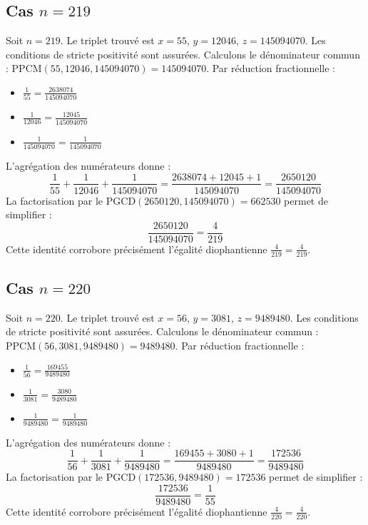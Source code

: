\documentclass[11pt,a4paper]{article}
\begin{document}
\subsection{Cas $n = 219$}
Soit $n = 219$. Le triplet trouvé est $x = 55$, $y = 12046$, $z = 145094070$.
Les conditions de stricte positivité sont assurées.
Calculons le dénominateur commun : $\text{PPCM}(55, 12046, 145094070) = 145094070$.
Par réduction fractionnelle :
\begin{itemize}
    \item $\frac{1}{55} = \frac{2638074}{145094070}$
    \item $\frac{1}{12046} = \frac{12045}{145094070}$
    \item $\frac{1}{145094070} = \frac{1}{145094070}$
\end{itemize}
L'agrégation des numérateurs donne :
$$ \frac{1}{55} + \frac{1}{12046} + \frac{1}{145094070} = \frac{2638074 + 12045 + 1}{145094070} = \frac{2650120}{145094070} $$
La factorisation par le $\text{PGCD}(2650120, 145094070) = 662530$ permet de simplifier :
$$ \frac{2650120}{145094070} = \frac{4}{219} $$
Cette identité corrobore précisément l'égalité diophantienne $\frac{4}{219} = \frac{4}{219}$.

\subsection{Cas $n = 220$}
Soit $n = 220$. Le triplet trouvé est $x = 56$, $y = 3081$, $z = 9489480$.
Les conditions de stricte positivité sont assurées.
Calculons le dénominateur commun : $\text{PPCM}(56, 3081, 9489480) = 9489480$.
Par réduction fractionnelle :
\begin{itemize}
    \item $\frac{1}{56} = \frac{169455}{9489480}$
    \item $\frac{1}{3081} = \frac{3080}{9489480}$
    \item $\frac{1}{9489480} = \frac{1}{9489480}$
\end{itemize}
L'agrégation des numérateurs donne :
$$ \frac{1}{56} + \frac{1}{3081} + \frac{1}{9489480} = \frac{169455 + 3080 + 1}{9489480} = \frac{172536}{9489480} $$
La factorisation par le $\text{PGCD}(172536, 9489480) = 172536$ permet de simplifier :
$$ \frac{172536}{9489480} = \frac{1}{55} $$
Cette identité corrobore précisément l'égalité diophantienne $\frac{4}{220} = \frac{4}{220}$.
\end{document}
